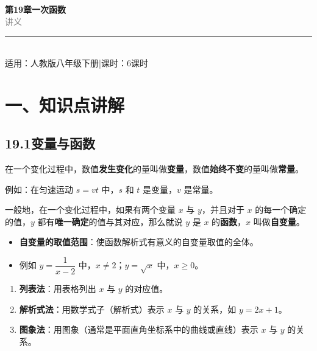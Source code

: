 \documentclass[12pt, a4paper]{ctexart}
\begin{document}
\begin{center}
{\Huge\bfseries\textcolor{mainblue}{第19章\quad 一次函数}}\\[12pt]
{\Large\textcolor{gray}{讲\quad 义}}\\[8pt]
\rule{0.6\textwidth}{1pt}\\[8pt]
{\normalsize 适用：人教版\quad 八年级下册\quad |\quad 课时：6课时}
\end{center}
\vspace{10pt}

\section*{\textcolor{mainblue}{一、知识点讲解}}

\subsection*{19.1\quad 变量与函数}

\begin{knowledgebox}[变量与常量]
在一个变化过程中，数值\textbf{发生变化}的量叫做\textbf{变量}，数值\textbf{始终不变}的量叫做\textbf{常量}。

例如：在匀速运动 $s = vt$ 中，$s$ 和 $t$ 是变量，$v$ 是常量。
\end{knowledgebox}

\begin{knowledgebox}[函数的定义]
一般地，在一个变化过程中，如果有两个变量 $x$ 与 $y$，并且对于 $x$ 的每一个确定的值，$y$ 都有\textbf{唯一确定}的值与其对应，那么就说 $y$ 是 $x$ 的\textbf{函数}，$x$ 叫做\textbf{自变量}。

\begin{itemize}[leftmargin=2em]
  \item \textbf{自变量的取值范围}：使函数解析式有意义的自变量取值的全体。
  \item 例如 $y=\dfrac{1}{x-2}$ 中，$x\neq 2$；$y=\sqrt{x}$ 中，$x\geqslant 0$。
\end{itemize}
\end{knowledgebox}

\begin{knowledgebox}[函数的三种表示法]
\begin{enumerate}[leftmargin=2em]
  \item \textbf{列表法}：用表格列出 $x$ 与 $y$ 的对应值。
  \item \textbf{解析式法}：用数学式子（解析式）表示 $x$ 与 $y$ 的关系，如 $y=2x+1$。
  \item \textbf{图象法}：用图象（通常是平面直角坐标系中的曲线或直线）表示 $x$ 与 $y$ 的关系。
\end{enumerate}
\end{knowledgebox}
\end{document}
